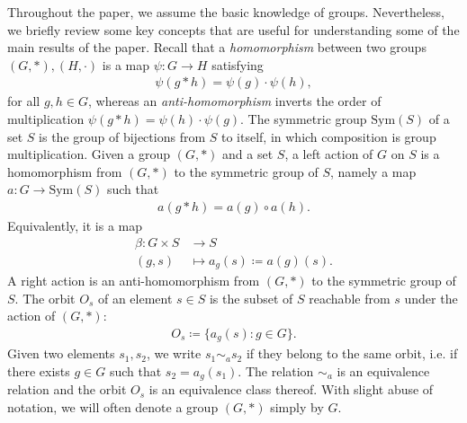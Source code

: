 \documentclass[10pt,leqno]{amsart}
\begin{document}
Throughout the paper, we assume the basic knowledge of groups. Nevertheless, we briefly review some key concepts that are useful for understanding some of the main results of the paper.
%
%
%
%
%
%
%
%
%
%
%
%
%
%
%
%
%
Recall that a \emph{homomorphism} between two groups $(G, *), (H, \cdot)$ is a map $\psi : G \to H$ satisfying
\begin{align*}
    \psi(g * h) = \psi(g) \cdot \psi(h),
\end{align*}
for all $g, h \in G$, whereas an \emph{anti-homomorphism} inverts the order of multiplication $\psi(g * h) = \psi(h) \cdot \psi(g)$. The symmetric group $\text{Sym}(S)$ of a set $S$ is the group of bijections from $S$ to itself, in which composition is group multiplication. Given a group $(G, *)$ and a set $S$, a left action of $G$ on $S$ is a homomorphism from $(G, *)$ to the symmetric group of $S$, namely a map $a : G \to \text{Sym}(S)$ such that
\begin{align*}
    a(g * h) = a(g) \circ a(h).
\end{align*}
Equivalently, it is a map
\begin{align*}
    \beta : G \times S &\to S\\
    (g, s) &\mapsto a_g(s) \coloneqq a(g)(s).
\end{align*}
A right action is an anti-homomorphism from $(G, *)$ to the symmetric group of $S$. The orbit $O_s$ of an element $s \in S$ is the subset of $S$ reachable from $s$ under the action of $(G, *)$:
\begin{align*}
    O_s \coloneqq \{a_g(s) : g \in G\}.
\end{align*}
Given two elements $s_1, s_2$, we write $s_1 \sim_a s_2$ if they belong to the same orbit, i.e. if there exists $g \in G$ such that $s_2 = a_g(s_1)$. The relation $\sim_a$ is an equivalence relation and the orbit $O_s$ is an equivalence class thereof. With slight abuse of notation, we will often denote a group $(G, *)$ simply by $G$.
\end{document}
